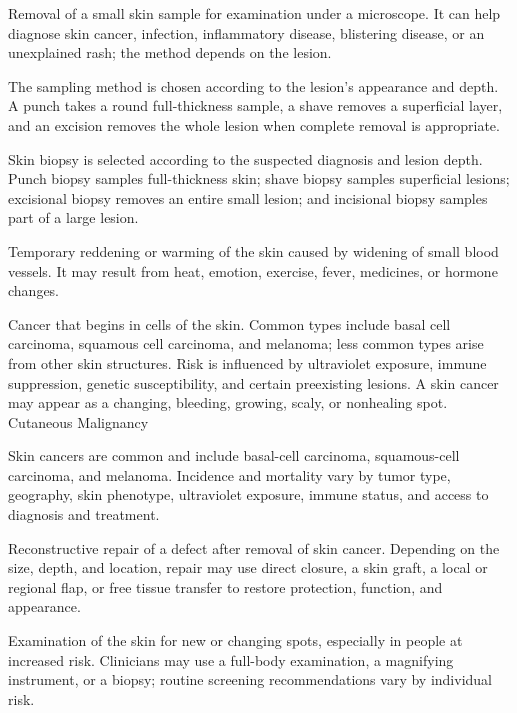  Removal of a small skin sample for examination under a microscope. It can help diagnose skin cancer, infection, inflammatory disease, blistering disease, or an unexplained rash; the method depends on the lesion.

 The sampling method is chosen according to the lesion’s appearance and depth. A punch takes a round full-thickness sample, a shave removes a superficial layer, and an excision removes the whole lesion when complete removal is appropriate.

 Skin biopsy is selected according to the suspected diagnosis and lesion depth. Punch
biopsy samples full-thickness skin; shave biopsy samples superficial lesions; excisional
biopsy removes an entire small lesion; and incisional biopsy samples part of a large
lesion.

 Temporary reddening or warming of the skin caused by widening of small blood vessels. It may result from heat, emotion, exercise, fever, medicines, or hormone changes.

 Cancer that begins in cells of the skin. Common types include basal cell carcinoma, squamous cell carcinoma, and melanoma; less common types arise from other skin structures. Risk is influenced by ultraviolet exposure, immune suppression, genetic susceptibility, and certain preexisting lesions. A skin cancer may appear as a changing, bleeding, growing, scaly, or nonhealing spot.
\synonyms
Cutaneous Malignancy

 Skin cancers are common and include basal-cell carcinoma, squamous-cell carcinoma, and
melanoma. Incidence and mortality vary by tumor type, geography, skin phenotype, ultraviolet
exposure, immune status, and access to diagnosis and treatment.

 Reconstructive repair of a defect after removal of skin cancer. Depending on the size, depth, and location, repair may use direct closure, a skin graft, a local or regional flap, or free tissue transfer to restore protection, function, and appearance.

 Examination of the skin for new or changing spots, especially in people at increased risk. Clinicians may use a full-body examination, a magnifying instrument, or a biopsy; routine screening recommendations vary by individual risk.

